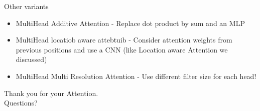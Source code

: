 \documentclass{beamer}
\begin{document}
\begin{frame}[fragile]{Other variants}
\begin{itemize}
	\item MultiHead Additive Attention - Replace dot product by sum and an MLP
	\item MultiHead locatiob aware attebtuib - Consider attention weights from previous positions and use a CNN (like Location aware Attention we discussed)
	\item MultiHead Multi Resolution Attention - Use different filter size for each head!
\end{itemize}
\end{frame}


{
	\begin{frame}[standout]
	Thank you for your Attention.\\
	Questions?
\end{frame}
}
\end{document}
